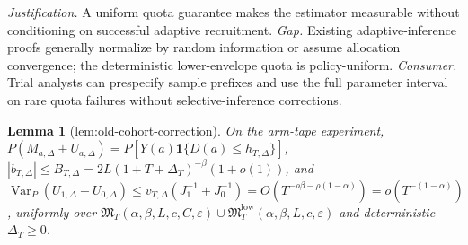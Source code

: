 \documentclass{article}
\newtheorem{lemma}{Lemma}
\begin{document}
\par\smallskip\noindent \textit{Justification.} A uniform quota guarantee makes the estimator measurable without conditioning on successful adaptive recruitment. \textit{Gap.} Existing adaptive-inference proofs generally normalize by random information or assume allocation convergence; the deterministic lower-envelope quota is policy-uniform. \textit{Consumer.} Trial analysts can prespecify sample prefixes and use the full parameter interval on rare quota failures without selective-inference corrections.

\begin{lemma}[lem:old-cohort-correction]\label{lem:old-cohort-correction}
On the arm-tape experiment, \(P(M_{a,\Delta}+U_{a,\Delta})=P[Y(a)\mathbf 1\{D(a)\leq h_{T,\Delta}\}]\), \(|b_{T,\Delta}|\leq B_{T,\Delta}=2L(1+T+\Delta_T)^{-\beta}(1+o(1))\), and \(\operatorname{Var}_P(U_{1,\Delta}-U_{0,\Delta})\leq v_{T,\Delta}(J_1^{-1}+J_0^{-1})=O(T^{-\rho\beta-\rho(1-\alpha)})=o(T^{-(1-\alpha)})\), uniformly over \(\mathfrak M_T(\alpha,\beta,L,c,C,\varepsilon)\cup\mathfrak M_T^{\mathrm{low}}(\alpha,\beta,L,c,\varepsilon)\) and deterministic \(\Delta_T\geq0\).
\end{lemma}
\end{document}
